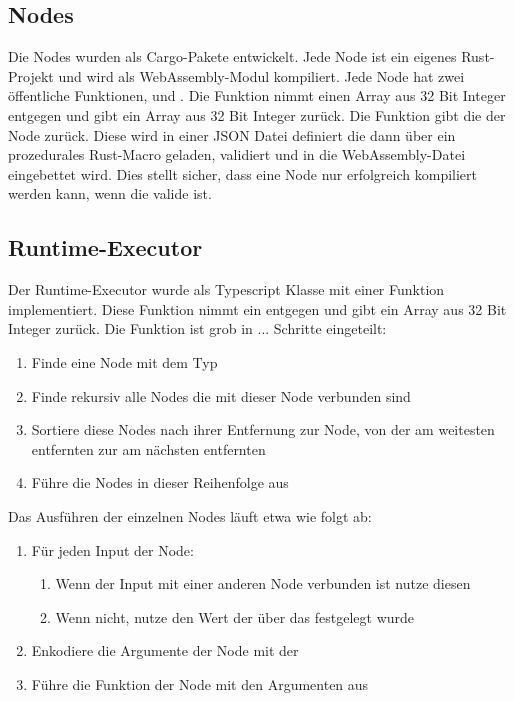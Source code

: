\documentclass[ngerman]{article}
\begin{document}
\subsection{Nodes}
Die Nodes wurden als Cargo-Pakete entwickelt. Jede Node ist ein eigenes Rust-Projekt und wird als WebAssembly-Modul kompiliert.
\br
Jede Node hat zwei öffentliche Funktionen,  und . Die  Funktion nimmt einen Array aus 32 Bit Integer entgegen und gibt ein Array aus 32 Bit Integer zurück. 
\br
Die  Funktion gibt die  der Node zurück. 
Diese  wird in einer JSON Datei definiert die dann über ein prozedurales Rust-Macro geladen, validiert und in die WebAssembly-Datei eingebettet wird. Dies stellt sicher, dass eine Node nur erfolgreich kompiliert werden kann, wenn die  valide ist.

\subsection{Runtime-Executor}
Der Runtime-Executor wurde als Typescript Klasse mit einer  Funktion implementiert. Diese  Funktion nimmt ein  entgegen und gibt ein Array aus 32 Bit Integer zurück. Die Funktion ist grob in ... Schritte eingeteilt:

\begin{enumerate}
  \item Finde eine Node mit dem Typ 
  \item Finde rekursiv alle Nodes die mit dieser Node verbunden sind
  \item Sortiere diese Nodes nach ihrer Entfernung zur  Node, von der am weitesten entfernten zur am nächsten entfernten
  \item Führe die Nodes in dieser Reihenfolge aus
\end{enumerate}

Das Ausführen der einzelnen Nodes läuft etwa wie folgt ab:

\begin{enumerate}
  \item Für jeden Input der Node:
  \begin{enumerate}
      \item Wenn der Input mit einer anderen Node verbunden ist nutze diesen
      \item Wenn nicht, nutze den Wert der über das  festgelegt wurde
  \end{enumerate}
  \item Enkodiere die Argumente der Node mit der 
  \item Führe die  Funktion der Node mit den Argumenten aus
\end{enumerate}
\end{document}

